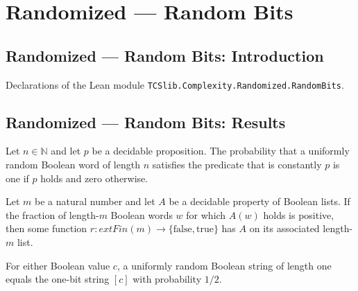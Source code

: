 \section{Randomized --- Random Bits}
\subsection*{Randomized --- Random Bits: Introduction}

Declarations of the Lean module \texttt{TCSlib.Complexity.Randomized.RandomBits}.

\subsection*{Randomized --- Random Bits: Results}

\begin{theorem}
\label{Randomized.randProb_const}
\leanok
{}
Let $n\in\mathbb{N}$ and let $p$ be a decidable proposition. The probability that a
uniformly random Boolean word of length $n$ satisfies the predicate that is constantly
$p$ is one if $p$ holds and zero otherwise.
\end{theorem}

\begin{theorem}
\label{Randomized.exists_ofFn_of_randProb_pos}
\leanok
{}
Let $m$ be a natural number and let $A$ be a decidable property of Boolean lists. If the
fraction of length-$m$ Boolean words $w$ for which $A(w)$ holds is positive, then some
function $r : 	ext{Fin}(m) \to \{\mathrm{false},\mathrm{true}\}$ has $A$ on its
associated length-$m$ list.
\end{theorem}

\begin{theorem}
\label{Randomized.randProb_one_eq}
\leanok
{}
For either Boolean value $c$, a uniformly random Boolean string of length one equals the
one-bit string $[c]$ with probability $1/2$.
\end{theorem}

